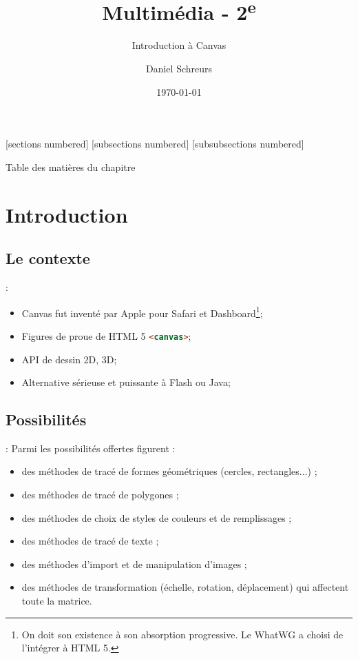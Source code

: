 \documentclass[10pt]{beamer}
\title{Multimédia - 2\textsuperscript{e}}
\subtitle{Introduction à Canvas}
\date{\today}
\author{Daniel Schreurs}
\institute{Haute École de Province de Liège}
\begin{document}
\maketitle

[sections numbered]
[subsections numbered]
[subsubsections numbered]
\begin{frame}[allowframebreaks]{Table des matières du chapitre}
    \tableofcontents[subsectionstyle=show/show/hide,subsubsectionstyle=show/show/hide,]
\end{frame}

\section{Introduction}
\tocss
\subsection{Le contexte}
\begin{frame}{\secname : \subsecname}
    \begin{itemize}
        \item Canvas fut inventé par Apple pour Safari et Dashboard\footnote{On doit son existence à son absorption progressive. Le WhatWG a choisi de l’intégrer à HTML 5.};
        \item Figures de proue de HTML 5 \lstinline[language=html]!<canvas>!;
        \item API de dessin 2D, 3D;
        \item Alternative sérieuse et puissante à Flash ou Java;
    \end{itemize}
\end{frame}

\subsection{Possibilités}
\begin{frame}{\secname : \subsecname}
    Parmi les possibilités offertes figurent :
    \begin{itemize}
        \item des méthodes de tracé de formes géométriques (cercles, rectangles...) ;
        \item des méthodes de tracé de polygones ;
        \item des méthodes de choix de styles de couleurs et de remplissages ;
        \item des méthodes de tracé de texte ;
        \item des méthodes d’import et de manipulation d’images ;
        \item des méthodes de transformation (échelle, rotation, déplacement) qui affectent
              toute la matrice.
    \end{itemize}
\end{frame}
\end{document}
